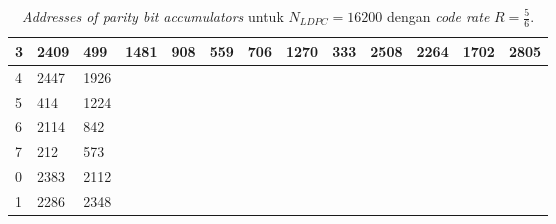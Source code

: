 \begin{table}[tb]
	\centering
	\caption{\textit{Addresses of parity bit accumulators} untuk $N_{LDPC}=16200$ dengan \textit{code rate} $R=\frac{5}{6}$.}
	\label{table:rate2}
	\begin{tabular}{|l|l|l|llllllllll}
		\hline
		3 & 2409 & 499  & \multicolumn{1}{l|}{1481} & \multicolumn{1}{l|}{908} & \multicolumn{1}{l|}{559} & \multicolumn{1}{l|}{706} & \multicolumn{1}{l|}{1270} & \multicolumn{1}{l|}{333} & \multicolumn{1}{l|}{2508} & \multicolumn{1}{l|}{2264} & \multicolumn{1}{l|}{1702} & \multicolumn{1}{l|}{2805} \\ \hline
		4 & 2447 & 1926 &                           &                          &                          &                          &                           &                          &                           &                           &                           &                           \\ \cline{1-3}
		5 & 414  & 1224 &                           &                          &                          &                          &                           &                          &                           &                           &                           &                           \\ \cline{1-3}
		6 & 2114 & 842  &                           &                          &                          &                          &                           &                          &                           &                           &                           &                           \\ \cline{1-3}
		7 & 212  & 573  &                           &                          &                          &                          &                           &                          &                           &                           &                           &                           \\ \cline{1-3}
		0 & 2383 & 2112 &                           &                          &                          &                          &                           &                          &                           &                           &                           &                           \\ \cline{1-3}
		1 & 2286 & 2348 &                           &                          &                          &                          &                           &                          &                           &                           &                           &                           \\ \cline{1-3}

\end{tabular}
\end{table}
